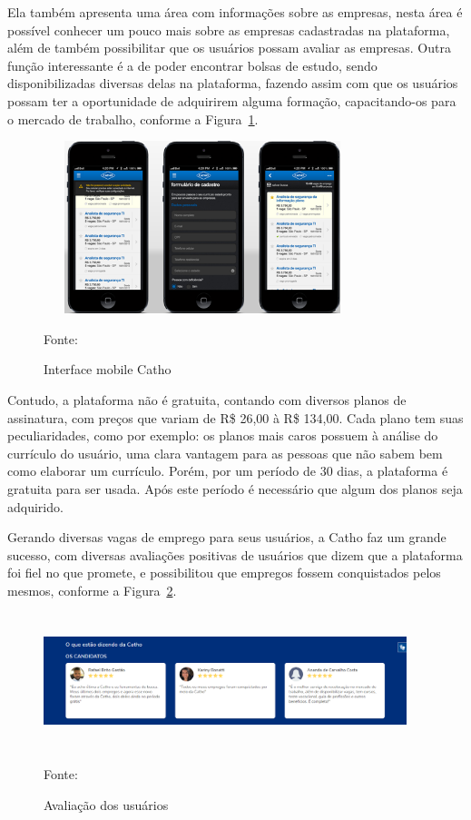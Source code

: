 Ela também apresenta uma área com informações sobre as empresas, nesta área é possível conhecer um pouco mais sobre as empresas cadastradas na plataforma, além de também possibilitar que os usuários possam avaliar as empresas. Outra função interessante é a de poder encontrar bolsas de estudo, sendo disponibilizadas diversas delas na plataforma, fazendo assim com que os usuários possam ter a oportunidade de adquirirem alguma formação, capacitando-os para o mercado de trabalho, conforme a Figura~\hypersetup{linkcolor=black}\ref{fig:Interface}.


\begin{figure}[!h]
	\centering
		
	\caption{Interface mobile Catho}
	\includegraphics[width=350px, height=190px]{./images/cathoMobile.png}
		\label{fig:Interface}
	\par {Fonte: \cite{catho}}
\end{figure}

\newpage

Contudo, a plataforma não é gratuita, contando com diversos planos de assinatura, com preços que variam de R\$ 26,00 à R\$ 134,00. Cada plano tem suas peculiaridades, como por exemplo: os planos mais caros possuem à análise do currículo do usuário, uma clara vantagem para as pessoas que não sabem bem como elaborar um currículo. Porém, por um período de 30 dias, a plataforma é gratuita para ser usada. Após este período é necessário que algum dos planos seja adquirido.

Gerando diversas vagas de emprego para seus usuários, a Catho faz um grande sucesso, com diversas avaliações positivas de usuários que dizem que a plataforma foi fiel no que promete, e possibilitou que empregos fossem conquistados pelos mesmos, conforme a Figura~\hypersetup{linkcolor=black}\ref{fig:Avaliação}.

\begin{figure}[!h]
	\centering
			
	\caption{Avaliação dos usuários}
	\includegraphics[width=400px, height=150px]{./images/cathoMobile1.png}
	\label{fig:Avaliação}
	\par {Fonte: \cite{catho-3}}
\end{figure}


